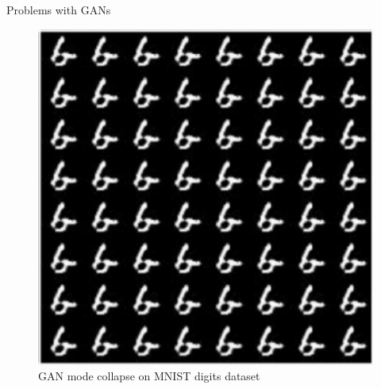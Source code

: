 \begin{frame}[allowframebreaks]{Problems with GANs}
\framebreak
\begin{figure}
    \centering
    \includegraphics[height=0.85\textheight, width=\textwidth, keepaspectratio]{images/gan/gan_mode_collapse_2.png}
    \caption{GAN mode collapse on MNIST digits dataset}
\end{figure}
    
\end{frame}